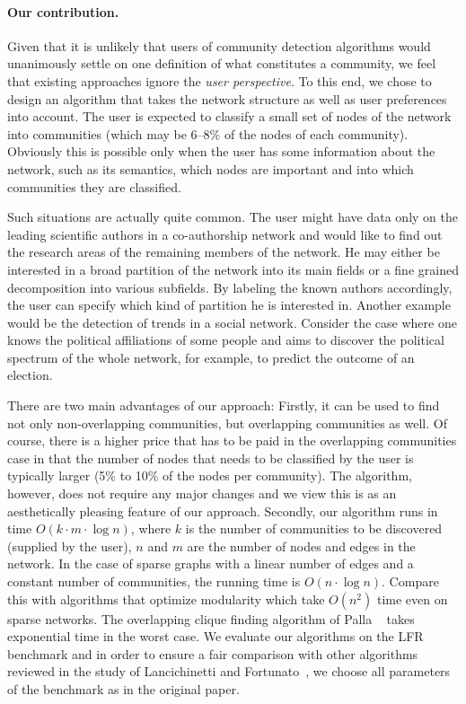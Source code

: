 \paragraph{Our contribution.}
Given that it is unlikely that users of community detection algorithms 
would unanimously settle on one definition of what constitutes a community, 
we feel that existing approaches ignore the \emph{user perspective}.
To this end, we chose to design an algorithm that takes the network structure 
as well as user preferences into account. 
The user is expected to classify a small set of nodes of the network 
into communities (which may be 6--8\% of the nodes of each community).
Obviously this is possible only when the user has some 
information about the network, such as its semantics, which nodes 
are important and into which communities they are classified. 

Such situations are actually quite common. The user might have data only on the
leading scientific authors in a co-authorship network and would like to find out
the research areas of the remaining members of the network.  He may either be
interested in a broad partition of the network into its main fields or a fine
grained decomposition into various subfields.  By labeling the known authors
accordingly, the user can specify which kind of partition he is interested in.
Another example would be the detection of trends in a social network.  Consider
the case where one knows the political affiliations of some people and aims to
discover the political spectrum of the whole network, for example, to predict
the outcome of an election. 

There are two main advantages of our approach: Firstly, it can be used to find
not only non-overlapping communities, but overlapping communities as well. Of
course, there is a higher price that has to be paid in the overlapping
communities case in that the number of nodes that needs to be classified by the
user is typically larger (5\% to 10\% of the nodes per community). The
algorithm, however, does not require any major changes and we view this is as an
aesthetically pleasing feature of our approach.  Secondly, our algorithm runs in
time $O(k \cdot m \cdot \log n)$, where $k$ is the number of communities to be
discovered (supplied by the user), $n$ and $m$ are the number of nodes and edges
in the network. In the case of sparse graphs with a linear number of edges and a
constant number of communities, the running time is $O(n \cdot \log n)$.
Compare this with algorithms that optimize modularity which take $O(n^2)$ time
even on sparse networks. The overlapping clique finding algorithm of Palla
\etal~\cite{PDFV05} takes exponential time in the worst case. We evaluate our
algorithms on the LFR benchmark and in order to ensure a fair comparison with
other algorithms reviewed in the study of Lancichinetti and
Fortunato~\cite{LF09}, we choose all parameters of the benchmark as in the
original paper.


